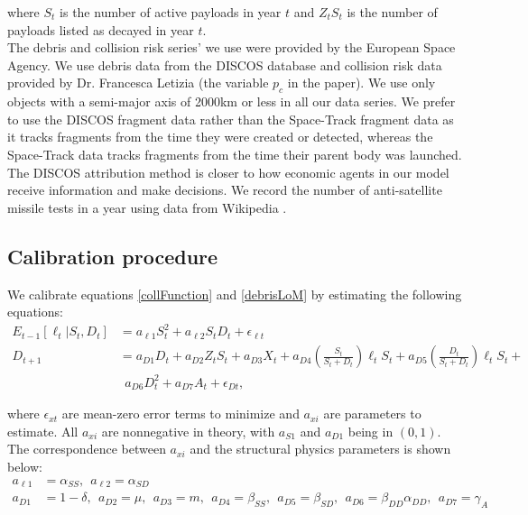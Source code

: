 \documentclass[12pt]{article}
\begin{document}
where $S_t$ is the number of active payloads in year $t$ and $Z_tS_t$ is the number of payloads listed as decayed in year $t$. \\

The debris and collision risk series' we use were provided by the European Space Agency. We use debris data from the DISCOS database \citep{FRAGdata} and collision risk data provided by Dr. Francesca Letizia \citep{ECOBdata} (the variable $p_c$ in the paper). We use only objects with a semi-major axis of 2000km or less in all our data series. We prefer to use the DISCOS fragment data rather than the Space-Track fragment data as it tracks fragments from the time they were created or detected, whereas the Space-Track data tracks fragments from the time their parent body was launched. The DISCOS attribution method is closer to how economic agents in our model receive information and make decisions. We record the number of anti-satellite missile tests in a year using data from Wikipedia \citep{ASATdata}.


\subsection*{Calibration procedure}
We calibrate equations \ref{collFunction} and \ref{debrisLoM} by estimating the following equations:
\begin{align}
\label{riskEstimation}
E_{t-1}[\ell_t|S_t,D_t] &= a_{\ell 1} S_t^2 + a_{\ell 2} S_t D_t + \epsilon_{\ell t}  \\
\label{debLoMEstimation}
D_{t+1} &= a_{D 1} D_t + a_{D 2}Z_tS_t + a_{D 3} X_t  + a_{D4} \left( \frac{S_t}{S_t+D_t} \right ) \ell_t S_t + a_{D5}\left( \frac{D_t}{S_t+D_t} \right ) \ell_t S_t + \\
&~~  a_{D6} D_t^2 + a_{D7}A_t + \epsilon_{D t},
\end{align}

where $\epsilon_{xt}$ are mean-zero error terms to minimize and $a_{xi}$ are parameters to estimate. All $a_{xi}$ are nonnegative in theory, with $a_{S1}$ and $a_{D1}$ being in $(0,1)$. The correspondence between $a_{xi}$ and the structural physics parameters is shown below:
\begin{align*}
a_{\ell 1} &= \alpha_{SS}, ~~ a_{\ell 2} = \alpha_{SD} \\
a_{D1} &= 1-\delta, ~~ a_{D 2} = \mu, ~~ a_{D 3} = m, ~~ a_{D4} = \beta_{SS}, ~~ a_{D5} = \beta_{SD}, ~~ a_{D6} = \beta_{DD}\alpha_{DD}, ~~ a_{D7} = \gamma_A
\end{align*}
\end{document}
